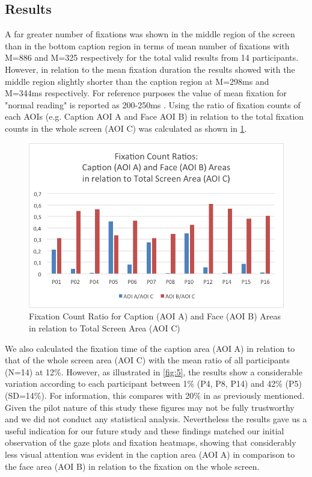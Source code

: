 \documentclass[output=paper]{langsci/langscibook}
\begin{document}
\subsection{Results}

A far greater number of fixations was shown in the middle region of the screen than in the bottom caption region in terms of mean number of fixations with M=886 and M=325 respectively for the total valid results from 14 participants. However, in relation to the mean fixation duration the results showed with the middle region slightly shorter than the caption region at M=298ms and M=344ms respectively. For reference purposes the value of mean fixation for "normal reading" is reported as 200-250ms \citep{Bruycker2007}. Using the ratio of fixation counts of each AOIs (e.g. Caption AOI A and Face AOI B) in relation to the total fixation counts in the whole screen (AOI C) was calculated as shown in \ref{fig:4}. 

\begin{figure}
 \includegraphics[width=\textwidth]{figures/OHagan4.png}
\caption{Fixation Count Ratio for Caption (AOI A) and Face (AOI B) Areas in relation to Total Screen Area (AOI C) }
\label{fig:4}
\end{figure}

We also calculated the fixation time of the caption area (AOI A) in relation to that of the whole screen area (AOI C) with the mean ratio of all participants (N=14) at 12\%.  However, as illustrated in \ref{fig:5}, the results show a considerable variation according to each participant between 1\% (P4, P8, P14) and 42\% (P5) (SD=14\%).  For information, this compares with 20\% in \citet{dydewalle1991} as previously mentioned. Given the pilot nature of this study these figures may not be fully trustworthy and we did not conduct any statistical analysis. Nevertheless the results gave us a useful indication for our future study and these findings matched our initial observation of the gaze plots and fixation heatmaps, showing that considerably less visual attention was evident in the caption area (AOI A) in comparison to the face area (AOI B) in relation to the fixation on the whole screen.  
\end{document}
